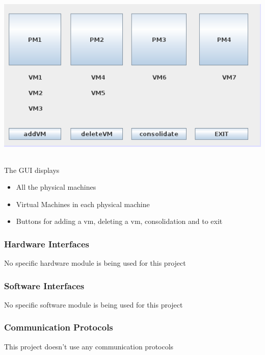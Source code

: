 \documentclass[a4paper,11pt]{article}
\begin{document}
 			\includegraphics[height=8cm]{images/gui}
 			\\
 			\\
			The GUI displays 			
			\begin{itemize}
				\item All the physical machines
				\item Virtual Machines in each physical machine
				\item Buttons for adding a vm, deleting a vm, consolidation and to exit 
			\end{itemize}

			\subsubsection{Hardware Interfaces}
			No specific hardware module is being used for this project
			\subsubsection{Software Interfaces}
			No specific software module is being used for this project 
			\subsubsection{Communication Protocols}
			This project doesn’t use any communication protocols
\end{document}
